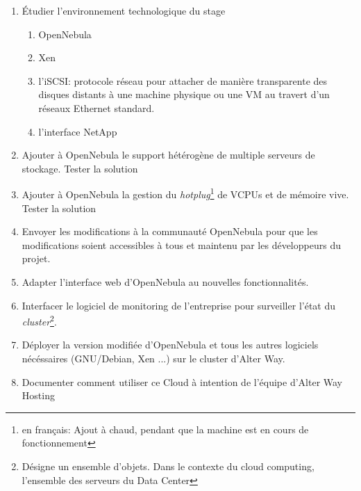 \begin{enumerate}
	\item Étudier l'environnement technologique du stage
		\begin{enumerate}
		\item OpenNebula
		\item Xen
		\item l'iSCSI: protocole réseau pour attacher de manière transparente des disques distants à une machine physique ou une VM
			au travert d'un réseaux Ethernet standard.
		\item l'interface NetApp
		\end{enumerate}
	\item Ajouter à OpenNebula le support hétérogène de multiple serveurs de stockage.
		\subitem Tester la solution
	\item Ajouter à OpenNebula la gestion du \emph{hotplug}\footnote{en français: Ajout à chaud, pendant que la machine est en cours de fonctionnement}
		de VCPUs et de mémoire vive.
		\subitem Tester la solution
	\item Envoyer les modifications à la communauté OpenNebula pour que les modifications soient accessibles à tous et maintenu par les développeurs du projet.
	\item Adapter l'interface web d'OpenNebula au nouvelles fonctionnalités.
	\item Interfacer le logiciel de monitoring de l'entreprise pour surveiller l'état du \emph{cluster}\footnote{Désigne un ensemble d'objets. Dans le contexte
	du cloud computing, l'ensemble des serveurs du Data Center}.
	\item Déployer la version modifiée d'OpenNebula et tous les autres logiciels nécéssaires (GNU/Debian, Xen ...) sur le cluster d'Alter Way.
	\item Documenter comment utiliser ce Cloud à intention de l'équipe d'Alter Way Hosting
\end{enumerate}

